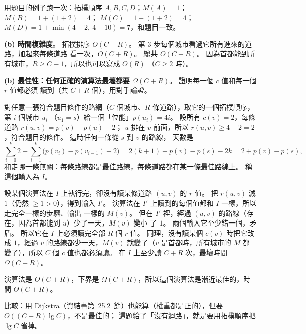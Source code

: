 \begin{pastsoln}
用題目的例子跑一次：拓樸順序 $A, B, C, D$；$M(A) = 1$；$M(B) = 1 + (1 + 2) = 4$；
$M(C) = 1 + (1 + 2) = 4$；$M(D) = 1 + \min(4 + 2,\ 4 + 10) = 7$，和題目一致。

\textbf{(b) 時間複雜度}。 拓樸排序 $O(C + R)$。 第 3 步每個城市看過它所有進來的道路，加起來每條道路
看一次，$O(C + R)$。 總共 $O(C + R)$。 因為首都能到所有城市，$R \ge C - 1$，所以也可以寫成 $O(R)$
（$C \ge 2$ 時）。

\textbf{(b) 最佳性：任何正確的演算法最壞都要 $\Omega(C + R)$}。 證明每一個 $c$ 值和每一個 $r$ 值都必須
讀到（共 $C + R$ 個），用對手論證。

對任意一張符合題目條件的路網（$C$ 個城市、$R$ 條道路），取它的一個拓樸順序，第 $i$ 個城市 $u_i$
（$u_1 = s$）給一個「位能」$p(u_i) = 4i$。 設所有 $c(v) = 2$，每條道路 $r(u, v) = p(v) - p(u) - 2$；
$u$ 排在 $v$ 前面，所以 $r(u, v) \ge 4 - 2 = 2$，符合題目的條件。 這時任何一條從 $s$ 到 $v$ 的路線，
天數是
\[
\sum_{i=0}^{k} 2 + \sum_{i=1}^{k} \bigl(p(v_i) - p(v_{i-1}) - 2\bigr) = 2(k + 1) + p(v) - p(s) - 2k
= 2 + p(v) - p(s) ,
\]
和走哪一條無關：每條路線都是最佳路線，每條道路都在某一條最佳路線上。 稱這個輸入為 $I$。

設某個演算法在 $I$ 上執行完，卻沒有讀某條道路 $(u, v)$ 的 $r$ 值。 把 $r(u, v)$ 減 $1$（仍然
$\ge 1 > 0$），得到輸入 $I'$。 演算法在 $I'$ 上讀到的每個值都和 $I$ 一樣，所以走完全一樣的步驟、輸出
一樣的 $M(v)$。 但在 $I'$ 裡，經過 $(u, v)$ 的路線（存在，因為首都能到 $u$）少了一天，$M(v)$ 變小
了 $1$。 兩個輸入它至少錯一個，矛盾。 所以它在 $I$ 上必須讀完全部 $R$ 個 $r$ 值。 同理，沒有讀某個
$c(v)$ 時把它改成 $1$，經過 $v$ 的路線都少一天，$M(v)$ 就變了（$v$ 是首都時，所有城市的 $M$ 都
變了），所以 $C$ 個 $c$ 值也都必須讀。 在 $I$ 上至少讀 $C + R$ 次，最壞時間 $\Omega(C + R)$。

演算法是 $O(C + R)$，下界是 $\Omega(C + R)$，所以這個演算法是漸近最佳的，時間 $\Theta(C + R)$。

比較：用 Dijkstra（資結書第~25.2~節）也能算（權重都是正的），但要 $O((C + R)\lg C)$，不是最佳的；
這題給了「沒有迴路」，就是要用拓樸順序把 $\lg C$ 省掉。
\end{pastsoln}
